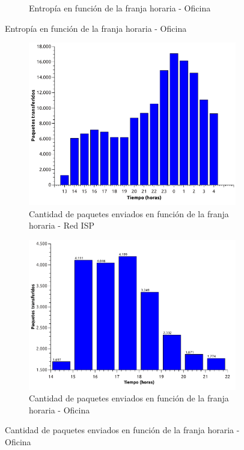 \begin{figure}[H]
\begin{subfigure}[H]{0.5\textwidth}
                \caption{Entrop\'ia en funci\'on de la franja horaria - Oficina}
                \label{fig:paquetes2}
        \end{subfigure}
\end{figure}

\begin{figure}[H]
        \begin{subfigure}[H]{0.5\textwidth}
                \centering
                \includegraphics[width=1\textwidth]{graficos/paquetesVsTiempoCasa.pdf}
                \caption{Cantidad de paquetes enviados en funci\'on de la franja horaria - Red ISP}
                \label{fig:paquetes1}
        \end{subfigure}
        \begin{subfigure}[H]{0.5\textwidth}
                \centering
                \includegraphics[width=1\textwidth]{graficos/paquetesVsTiempoOficina.pdf}
                \caption{Cantidad de paquetes enviados en funci\'on de la franja horaria - Oficina}
                \label{fig:paquetes2}
        \end{subfigure}
\end{figure}

